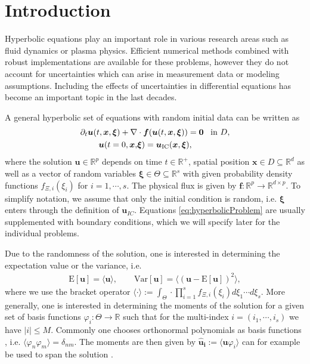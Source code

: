 \section{Introduction}
Hyperbolic equations play an important role in various research areas such as fluid dynamics or plasma physics. Efficient numerical methods combined with robust implementations are available for these problems, however they do not account for uncertainties which can arise in measurement data or modeling assumptions. Including the effects of uncertainties in differential equations has become an important topic in the last decades. %

A general hyperbolic set of equations with random initial data can be written as
\begin{subequations}\label{eq:hyperbolicProblem}
\begin{align}
\partial_t \bm{u}(t,\bm{x},\bm{\xi}) + \nabla&\cdot\bm{f}(\bm{u}(t,\bm{x},\bm{\xi})) = \bm{0} \enskip \text{ in } D, \\ \label{eq:ic}
\bm{u}(t=0,\bm{x},&\bm{\xi}) = \bm{u}_{\text{IC}}(\bm{x},\bm{\xi}),
\end{align}
\end{subequations}
where the solution $\bm u\in\mathbb{R}^p$ depends on time $t\in\mathbb{R}^+$, spatial position $\bm{x}\in D\subseteq \mathbb{R}^d$ as well as a vector of random variables $\bm{\xi}\in\Theta\subseteq\mathbb{R}^s$ with given probability density functions $f_{\Xi,i}(\xi_i)$ for $i = 1,\cdots,s$. The physical flux is given by $\bm{f}:\mathbb{R}^p\to\mathbb{R}^{d\times p}$. To simplify notation, we assume that only the initial condition is random, i.e. $\bm{\xi}$ enters through the definition of $\bm{u}_{IC}$. Equations \eqref{eq:hyperbolicProblem} are usually supplemented with boundary conditions, which we will specify later for the individual problems.

Due to the randomness of the solution, one is interested in determining the expectation value or the variance, i.e.
\begin{align*}
\text{E}[\bm{u}] = \langle \bm{u} \rangle,\qquad \text{Var}[\bm{u}] = \langle \left( \bm{u}-\text{E}[\bm{u}]\right)^2\rangle,
\end{align*}
where we use the bracket operator $\langle \cdot \rangle := \int_{\Theta} \cdot \prod_{i=1}^s f_{\Xi,i}(\xi_i)d\xi_1 \cdots d\xi_s$. More generally, one is interested in determining the moments of the solution for a given set of basis functions $\varphi_{i}:\Theta\to\mathbb{R}$ such that for the multi-index $i = (i_1,\cdots,i_s)$ we have $|i| \leq M$. Commonly one chooses orthonormal polynomials as basis functions \cite{xiu2002wiener}, i.e. $\langle \varphi_n \varphi_m \rangle = \delta_{nm}$.  The moments are then given by $\bm{\hat u_i} := \langle \bm{u}\varphi_i \rangle$ can for example be used to span the solution \cite{wiener1938homogeneous}. \\

